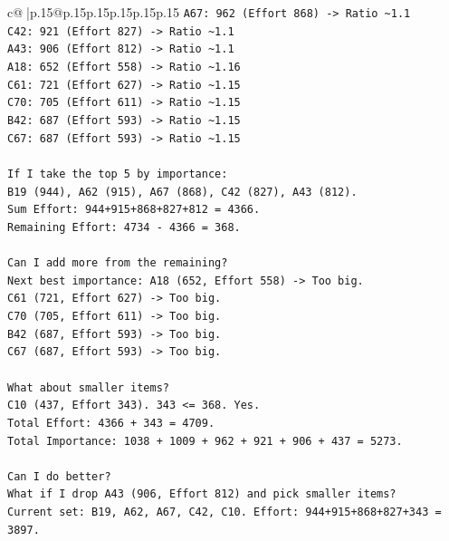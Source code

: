 \documentclass{article}
\begin{document}
{\begin{supertabular}{c@{$\;$}|p{.15\linewidth}@{}p{.15\linewidth}p{.15\linewidth}p{.15\linewidth}p{.15\linewidth}p{.15\linewidth}}
{{{\texttt{A67: 962 (Effort 868) {-}> Ratio \textasciitilde{}1.1} \\
\texttt{C42: 921 (Effort 827) {-}> Ratio \textasciitilde{}1.1} \\
\texttt{A43: 906 (Effort 812) {-}> Ratio \textasciitilde{}1.1} \\
\texttt{A18: 652 (Effort 558) {-}> Ratio \textasciitilde{}1.16} \\
\texttt{C61: 721 (Effort 627) {-}> Ratio \textasciitilde{}1.15} \\
\texttt{C70: 705 (Effort 611) {-}> Ratio \textasciitilde{}1.15} \\
\texttt{B42: 687 (Effort 593) {-}> Ratio \textasciitilde{}1.15} \\
\texttt{C67: 687 (Effort 593) {-}> Ratio \textasciitilde{}1.15} \\
\\ 
\texttt{If I take the top 5 by importance:} \\
\texttt{B19 (944), A62 (915), A67 (868), C42 (827), A43 (812).} \\
\texttt{Sum Effort: 944+915+868+827+812 = 4366.} \\
\texttt{Remaining Effort: 4734 {-} 4366 = 368.} \\
\\ 
\texttt{Can I add more from the remaining?} \\
\texttt{Next best importance: A18 (652, Effort 558) {-}> Too big.} \\
\texttt{C61 (721, Effort 627) {-}> Too big.} \\
\texttt{C70 (705, Effort 611) {-}> Too big.} \\
\texttt{B42 (687, Effort 593) {-}> Too big.} \\
\texttt{C67 (687, Effort 593) {-}> Too big.} \\
\\ 
\texttt{What about smaller items?} \\
\texttt{C10 (437, Effort 343). 343 <= 368. Yes.} \\
\texttt{Total Effort: 4366 + 343 = 4709.} \\
\texttt{Total Importance: 1038 + 1009 + 962 + 921 + 906 + 437 = 5273.} \\
\\ 
\texttt{Can I do better?} \\
\texttt{What if I drop A43 (906, Effort 812) and pick smaller items?} \\
\texttt{Current set: B19, A62, A67, C42, C10. Effort: 944+915+868+827+343 = 3897.} \\
}}}
\end{supertabular}}
\end{document}
